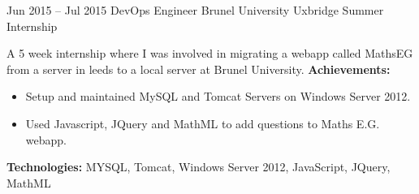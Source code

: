 \cventry
{Jun 2015 -- Jul 2015}
{DevOps Engineer}
{Brunel University}
{Uxbridge}
{Summer Internship}
{A 5 week internship where I was involved in migrating a webapp called MathsEG from a server in leeds to a local server at Brunel University. \newline{}
\textbf{Achievements:}
	{\begin{itemize}
		\item{Setup and maintained MySQL and Tomcat Servers on Windows Server 2012.}
		\item{Used Javascript, JQuery and MathML to add questions to Maths E.G. webapp.}
	\end{itemize}}
\textbf{Technologies:} {\scriptsize MYSQL, Tomcat, Windows Server 2012, JavaScript, JQuery, MathML\newline{} }
}



